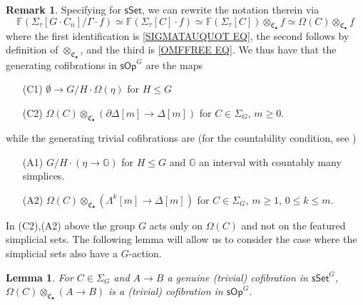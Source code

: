 \documentclass[a4paper,10pt
,draft
]{article}%
\numberwithin{equation}{section}
\numberwithin{figure}{section}
\newtheorem{lemma}[equation]{Lemma}%
\theoremstyle{definition} %
\newtheorem{remark}[equation]{Remark}%
\newcommand{\sSet}{\ensuremath{\mathsf{sSet}}}%
\newcommand{\sOp}{\ensuremath{\mathsf{sOp}}}%
\newcommand{\1}{\ensuremath{\mathbbm 1}}%
\begin{document}
\begin{remark}
	Specifying \cite[Def. 4.19]{BP_HGOP}
	for $\mathsf{sSet}$, we can rewrite the notation therein via
\[
	\mathbb{F}
	\left(\Sigma_{\tau}[G \cdot C_{n}]/\Gamma \cdot f\right)
\simeq
	\mathbb{F}
	\left(\Sigma_{\tau}[C] \cdot f\right)
\simeq
	\mathbb{F}
	\left(\Sigma_{\tau}[C] \right) \otimes_{\mathfrak{C}_{\bullet}} f
\simeq 
	\Omega(C) \otimes_{\mathfrak{C}_{\bullet}} f
\]
where the first identification is
\eqref{SIGMATAUQUOT EQ},
the second follows by definition of
$\otimes_{\mathfrak{C}_{\bullet}}$,
and the third is \eqref{OMFFREE EQ}.
We thus have that the generating cofibrations in $\mathsf{sOp}^G$
are the maps
	\begin{itemize}
		\item[(C1)] $\emptyset \to G/H \cdot \Omega(\eta)$ for $H \leq G$
		\item[(C2)] $\Omega(C) \otimes_{\mathfrak{C}_{\bullet}} (\partial \Delta[m] \to \Delta[m])$
		for $C \in \Sigma_G$, $m \geq 0$.
	\end{itemize}
	while the generating trivial cofibrations are 
	(for the countability condition, see \cite[Rem. 4.17]{BP_HGOP})
	\begin{itemize}
		\item[(A1)] 
		$G/H \cdot \left(\eta \to \mathbb{G}\right)$ 
		for $H \leq G$ and $\mathbb G$ an interval with countably many simplices.
		\item[(A2)] 
		$\Omega(C) \otimes_{\mathfrak{C}_{\bullet}} (\Lambda^k[m] \to \Delta[m])$
		for $C \in \Sigma_G$, $m \geq 1$, $0 \leq k \leq m$.
	\end{itemize}
\end{remark}

In (C2),(A2) above 
the group $G$ acts only on $\Omega(C)$
and not on the featured simplicial sets.
The following lemma will allow us to consider the case where the simplicial sets also have a $G$-action.

\begin{lemma}
	\label{OPTENSCOF_LEM}
	For $C \in \Sigma_G$ and $A \to B$ a genuine (trivial) cofibration in $\sSet^G$,
	$\Omega(C) \otimes_{\mathfrak{C}_{\bullet}} (A \to B)$ is a (trivial) cofibration in $\sOp^G$.
\end{lemma}
\end{document}
